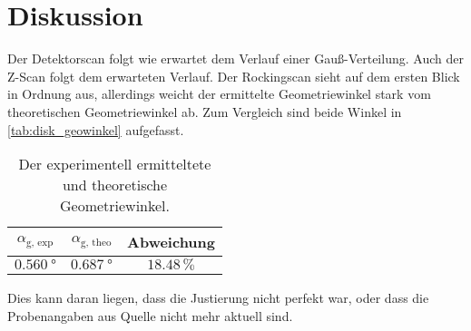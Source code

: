 \section{Diskussion}
\label{sec:Diskussion}
Der Detektorscan folgt wie erwartet dem Verlauf einer Gauß-Verteilung.
Auch der Z-Scan folgt dem erwarteten Verlauf.
Der Rockingscan sieht auf dem ersten Blick in Ordnung aus, allerdings weicht der ermittelte Geometriewinkel stark vom theoretischen Geometriewinkel ab.
Zum Vergleich sind beide Winkel in \autoref{tab:disk_geowinkel} aufgefasst.
\begin{table}
    \centering
    \caption{Der experimentell ermitteltete und theoretische Geometriewinkel.}
    \begin{tabular}{ccc}
        \toprule
        $\alpha_\text{g, exp}$ & $\alpha_\text{g, theo} $ & Abweichung \\
        \midrule
        $\SI{0.560}{\degree}$ & $\SI{0.687}{\degree}$ & $18.48 \, \%$ \\
        \bottomrule
    \end{tabular}
    \label{tab:disk_geowinkel}
\end{table}
Dies kann daran liegen, dass die Justierung nicht perfekt war, oder dass die Probenangaben aus Quelle \cite{alte_anleitung} nicht mehr aktuell sind.

